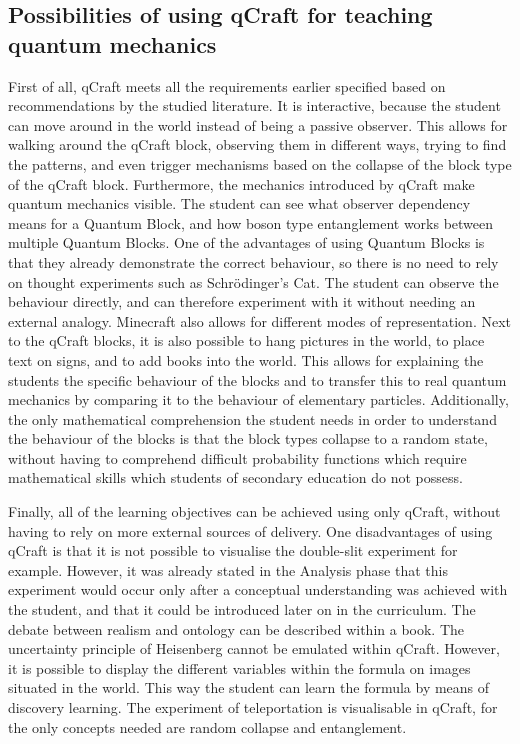 \documentclass[11pt,twoside]{report} %
\begin{document}
\subsection{Possibilities of using qCraft for teaching quantum mechanics}

First of all, qCraft meets all the requirements earlier specified based on recommendations by the studied literature. It is interactive, because the student can move around in the world instead of being a passive observer. This allows for walking around the qCraft block, observing them in different ways, trying to find the patterns, and even trigger mechanisms based on the collapse of the block type of the qCraft block. Furthermore, the mechanics introduced by qCraft make quantum mechanics visible. The student can see what observer dependency means for a Quantum Block, and how boson type entanglement works between multiple Quantum Blocks. One of the advantages of using Quantum Blocks is that they already demonstrate the correct behaviour, so there is no need to rely on thought experiments such as Schrödinger's Cat. The student can observe the behaviour directly, and can therefore experiment with it without needing an external analogy. Minecraft also allows for different modes of representation. Next to the qCraft blocks, it is also possible to hang pictures in the world, to place text on signs, and to add books into the world. This allows for explaining the students the specific behaviour of the blocks and to transfer this to real quantum mechanics by comparing it to the behaviour of elementary particles. Additionally, the only mathematical comprehension the student needs in order to understand the behaviour of the blocks is that the block types collapse to a random state, without having to comprehend difficult probability functions which require mathematical skills which students of secondary education do not possess.

Finally, all of the learning objectives can be achieved using only qCraft, without having to rely on more external sources of delivery. One disadvantages of using qCraft is that it is not possible to visualise the double-slit experiment for example. However, it was already stated in the Analysis phase that this experiment would occur only after a conceptual understanding was achieved with the student, and that it could be introduced later on in the curriculum. The debate between realism and ontology can be described within a book. The uncertainty principle of Heisenberg cannot be emulated within qCraft. However, it is possible to display the different variables within the formula on images situated in the world. This way the student can learn the formula by means of discovery learning. The experiment of teleportation is visualisable in qCraft, for the only concepts needed are random collapse and entanglement.
\end{document}
